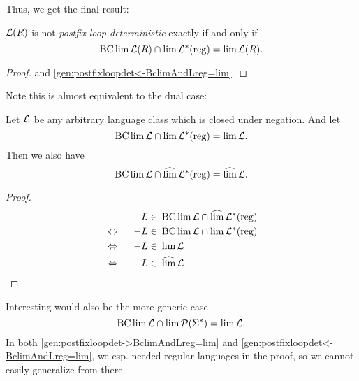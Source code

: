 Thus, we get the final result: \\

\begin{mdframed}
\begin{theorem}
\label{gen:postfix-loop-det=limAndBclim}
$\mathcal{L}(R)$ is not \emph{postfix-loop-deterministic} exactly if and only if
\[ \operatorname{BC} \lim \mathcal{L}(R) \cap \lim \mathcal{L}^*(\textup{\textrm{reg}}) = \lim \mathcal{L}(R) . \]
\end{theorem}
\end{mdframed}
\begin{proof}
 and \cref{gen:postfixloopdet<-BclimAndLreg=lim}.
\end{proof}

Note this is almost equivalent to the dual case:
\begin{lemma}
\label{gen:limAndBclim:dual}
Let $\mathcal{L}$ be any arbitrary language class which is closed under negation. And let
\[ \operatorname{BC} \lim \mathcal{L} \cap \lim \mathcal{L}^*(\textup{\textrm{reg}}) = \lim \mathcal{L} . \]
Then we also have
\[ \operatorname{BC} \lim \mathcal{L} \cap \operatorname{\widehat{lim}} \mathcal{L}^*(\textup{\textrm{reg}}) = \operatorname{\widehat{lim}} \mathcal{L} . \]
\begin{proof}
\begin{alignat*}{3}
&& L \in & \ \operatorname{BC} \lim \mathcal{L} \cap \operatorname{\widehat{lim}} \mathcal{L}^*(\textup{\textrm{reg}}) \\
&\Leftrightarrow \ \ & -L \in & \ \operatorname{BC} \lim \mathcal{L} \cap \lim \mathcal{L}^*(\textup{\textrm{reg}}) \\
&\Leftrightarrow \ \ & -L \in & \ \lim \mathcal{L} \\
&\Leftrightarrow \ \ & L \in & \ \operatorname{\widehat{lim}} \mathcal{L}
\end{alignat*}
\end{proof}
\end{lemma}

Interesting would also be the more generic case
\[ \operatorname{BC} \lim \mathcal{L} \cap \lim \mathcal{P}(\Sigma^*) = \lim \mathcal{L} .\]
In both \cref{gen:postfixloopdet->BclimAndLreg=lim} and \cref{gen:postfixloopdet<-BclimAndLreg=lim}, we esp. needed regular languages in the proof, so we cannot easily generalize from there.

%
%

